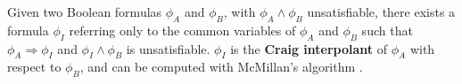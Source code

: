 \documentclass[twocolumn]{article}
\makeatletter
\def\subsection{\@startsection {subsection}{2}{\z@}{16pt plus 2pt minus 2pt}
{6pt plus 2pt minus 2pt}{\normalsize\sl
\edef\@svsec{\thesubsection.\ }}}
\def\thesubsection{\Alph{subsection}}
\makeatother
\begin{document}


Given two Boolean formulas $\phi_A$ and $\phi_B$,
with $\phi_A\wedge \phi_B$ unsatisfiable,
there exists a formula $\phi_I$ referring only
to the common variables of $\phi_A$ and $\phi_B$ such that $\phi_A\Rightarrow \phi_I$
and $\phi_I\wedge \phi_B$ is unsatisfiable.
$\phi_I$ is the \textbf{Craig interpolant} \cite{Craig} of $\phi_A$ with respect to $\phi_B$,
and can be computed with McMillan's algorithm \cite{interp_McMillan}.



\end{document}
